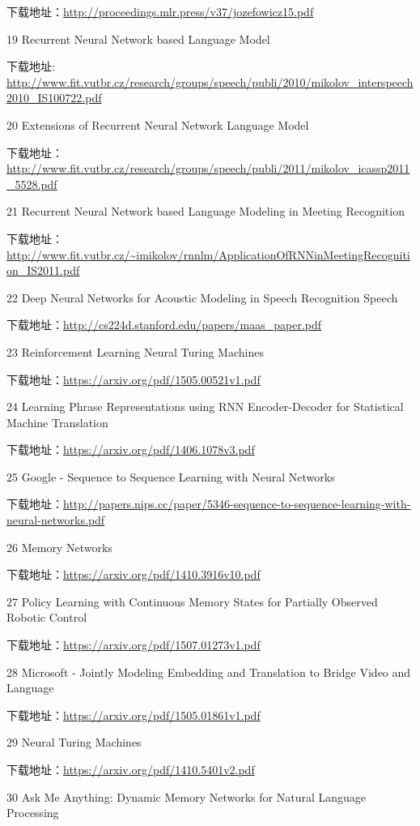 \documentclass[]{ctexbook}
\begin{document}
下载地址：\url{http://proceedings.mlr.press/v37/jozefowicz15.pdf}

19 Recurrent Neural Network based Language Model

下载地址: \url{http://www.fit.vutbr.cz/research/groups/speech/publi/2010/mikolov_interspeech2010_IS100722.pdf}

20 Extensions of Recurrent Neural Network Language Model

下载地址：\url{http://www.fit.vutbr.cz/research/groups/speech/publi/2011/mikolov_icassp2011_5528.pdf}

21 Recurrent Neural Network based Language Modeling in Meeting Recognition

下载地址：\url{http://www.fit.vutbr.cz/~imikolov/rnnlm/ApplicationOfRNNinMeetingRecognition_IS2011.pdf}

22 Deep Neural Networks for Acoustic Modeling in Speech Recognition Speech

下载地址：\url{http://cs224d.stanford.edu/papers/maas_paper.pdf}

23 Reinforcement Learning Neural Turing Machines

下载地址：\url{https://arxiv.org/pdf/1505.00521v1.pdf}

24 Learning Phrase Representations using RNN Encoder-Decoder for Statistical Machine Translation

下载地址：\url{https://arxiv.org/pdf/1406.1078v3.pdf}

25 Google - Sequence to Sequence Learning with Neural Networks

下载地址：\url{http://papers.nips.cc/paper/5346-sequence-to-sequence-learning-with-neural-networks.pdf}

26 Memory Networks

下载地址：\url{https://arxiv.org/pdf/1410.3916v10.pdf}

27 Policy Learning with Continuous Memory States for Partially Observed Robotic Control

下载地址：\url{https://arxiv.org/pdf/1507.01273v1.pdf}

28 Microsoft - Jointly Modeling Embedding and Translation to Bridge Video and Language

下载地址：\url{https://arxiv.org/pdf/1505.01861v1.pdf}

29 Neural Turing Machines

下载地址：\url{https://arxiv.org/pdf/1410.5401v2.pdf}

30 Ask Me Anything: Dynamic Memory Networks for Natural Language Processing
\end{document}
